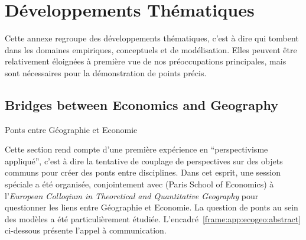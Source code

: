 



\newpage

\chapter{Développements Thématiques}


\label{app:thematic} %



Cette annexe regroupe des développements thématiques, c'est à dire qui tombent dans les domaines empiriques, conceptuels et de modélisation. Elles peuvent être relativement éloignées à première vue de nos préoccupations principales, mais sont nécessaires pour la démonstration de points précis.







\newpage

\section{Bridges between Economics and Geography}{Ponts entre Géographie et Economie}


\label{app:sec:ecogeo}


Cette section rend compte d'une première expérience en ``perspectivisme appliqué'', c'est à dire la tentative de couplage de perspectives sur des objets communs pour créer des ponts entre disciplines. Dans cet esprit, une session spéciale a été organisée, conjointement avec  (Paris School of Economics) à l'\emph{European Colloqium in Theoretical and Quantitative Geography} pour questionner les liens entre Géographie et Economie. La question de ponts au sein des modèles a été particulièrement étudiée. L'encadré~\ref{frame:app:ecogeo:abstract} ci-dessous présente l'appel à communication.


